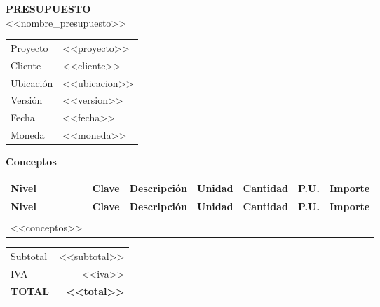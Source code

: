 \documentclass[11pt,a4paper]{article}
\begin{document}
\begin{center}
  {\Huge\color{Principal}\textbf{PRESUPUESTO}}\\[2mm]
  {\Large <<nombre_presupuesto>>}
\end{center}

\vspace{5mm}

\begin{tabularx}{\textwidth}{@{} l X @{}}
  Proyecto    & <<proyecto>>\\
  Cliente     & <<cliente>>\\
  Ubicaci\'on & <<ubicacion>>\\
  Versi\'on   & <<version>>\\
  Fecha       & <<fecha>>\\
  Moneda      & <<moneda>>\\
\end{tabularx}

\vspace{8mm}

{\Large\textbf{Conceptos}}

\renewcommand{\arraystretch}{1.2}
\begin{longtable}{@{}>{\centering\arraybackslash}p{1cm} >{\centering\arraybackslash}p{2cm} p{6cm} >{\centering\arraybackslash}p{1.2cm} >{\raggedleft\arraybackslash}p{2cm} >{\raggedleft\arraybackslash}p{1.4cm} >{\raggedleft\arraybackslash}p{2.2cm}@{}}
  \toprule
  \rowcolor{Gris2}
  \textbf{Nivel} & \textbf{Clave} & \textbf{Descripci\'on} &
  \textbf{Unidad} & \textbf{Cantidad} & \textbf{P.U.} & \textbf{Importe}\\
  \midrule
  \endfirsthead

  \toprule
  \rowcolor{Gris2}
  \textbf{Nivel} & \textbf{Clave} & \textbf{Descripci\'on} &
  \textbf{Unidad} & \textbf{Cantidad} & \textbf{P.U.} & \textbf{Importe}\\
  \midrule
  \endhead

  \midrule
  \multicolumn{7}{r}{\textit{Contin\'ua...}}\\
  \endfoot

  \bottomrule
  \endlastfoot

<<conceptos>>

\end{longtable}

\vspace{4mm}
\begin{flushright}
  \begin{tabular}{@{} l r @{}}
    \toprule
    Subtotal       & <<subtotal>>\\
    IVA            & <<iva>>\\
    \midrule
    \textbf{TOTAL} & \textbf{<<total>>}\\
    \bottomrule
  \end{tabular}
\end{flushright}
\end{document}
